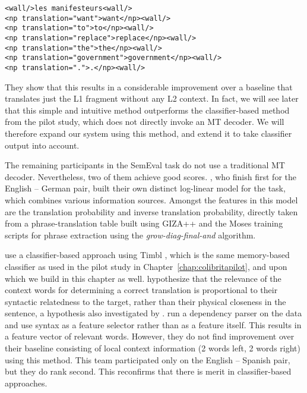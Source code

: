 \begin{exmp}
\label{ex:xml}
\begin{lstlisting}
<wall/>les manifesteurs<wall/>
<np translation="want">want</np><wall/>
<np translation="to">to</np><wall/>
<np translation="replace">replace</np><wall/>
<np translation="the">the</np><wall/>
<np translation="government">government</np><wall/>
<np translation=".">.</np><wall/>
\end{lstlisting}
\end{exmp}

They show that this results in a considerable improvement over a baseline that
translates just the L1 fragment without any L2 context. In fact, we will see
later that this simple and intuitive method outperforms the
classifier-based method from the pilot study, which does not directly invoke
an MT decoder. We will therefore expand our system using this method, and
extend it to take classifier output into account.

The remaining participants in the SemEval task do not use a
traditional MT decoder. Nevertheless, two of them achieve good scores.
\cite{IUCL}, who finish first for the English -- German pair, built
their own distinct log-linear model for the task, which combines
various information sources. Amongst the features in this model are
the translation probability and inverse translation probability,
directly taken from a phrase-translation table built using GIZA++
\citep{GIZA} and the Moses training scripts for phrase extraction
using the {\em grow-diag-final-and}\/ algorithm.

\cite{UNAL} use a classifier-based approach using Timbl \citep{TIMBL},
which is the same memory-based classifier as used in the pilot study in Chapter~\ref{chap:colibritapilot},
and upon which we build in this chapter as well. \cite{UNAL} hypothesize that the
relevance of the context words for determining a correct translation
is proportional to their syntactic relatedness to the target, rather
than their physical closeness in the sentence, a hypothesis also
investigated by \cite{Haque+11}. \cite{UNAL} run a dependency parser
on the data and use syntax as a feature selector rather than as a
feature itself. This results in a feature vector of relevant
words. However, they do not find improvement over their baseline consisting of
local context information (2 words left, 2 words right) using this
method. This team participated only on the English -- Spanish pair,
but they do rank second. This reconfirms that there is merit in
classifier-based approaches.

